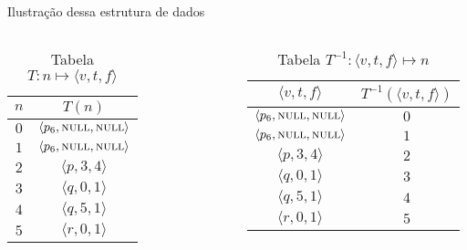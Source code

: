 \expandafter\documentclass\expandafter[table, usenames, svgnames, dvipsnames,14pt, \classopts]{beamer}
\begin{document}
\begin{frame}{Ilustração dessa estrutura de dados}
\begin{columns}[c]
            \begin{table}
                \scriptsize
                \caption{\scriptsize Tabela $T: n \mapsto \langle v,t,f \rangle$}
                \begin{tabular}{c|c}
                    $n$ & $T(n)$\\
                    \hline
                    $0$ & $\langle p_{6},\textproc{null},\textproc{null} \rangle$\\
                    $1$ & $\langle p_{6},\textproc{null},\textproc{null} \rangle$\\
                    $2$ & $\langle p,3,4 \rangle$\\
                    $3$ & $\langle q,0,1 \rangle$\\
                    $4$ & $\langle q,5,1 \rangle$\\
                    $5$ & $\langle r,0,1 \rangle$\\
                \end{tabular}
            \end{table}

        
            \begin{table}
                \scriptsize
                \caption{\scriptsize Tabela $T^{-1}: \langle v,t,f \rangle \mapsto n$}
                \begin{tabular}{c|c}
                    $\langle v,t,f \rangle$ & $T^{-1}(\langle v,t,f \rangle)$\\
                    \hline
                    $\langle p_{6},\textproc{null},\textproc{null} \rangle$ & $0$\\
                    $\langle p_{6},\textproc{null},\textproc{null} \rangle$ & $1$\\
                    $\langle p,3,4 \rangle$                               & $2$\\
                    $\langle q,0,1 \rangle$                               & $3$\\
                    $\langle q,5,1 \rangle$                               & $4$\\
                    $\langle r,0,1 \rangle$                               & $5$\\
                \end{tabular}
            \end{table}
            
    \end{columns}

    \vspace{-1em}
    
    \begin{center}
    \end{center}    
    
\end{frame}
\end{document}
